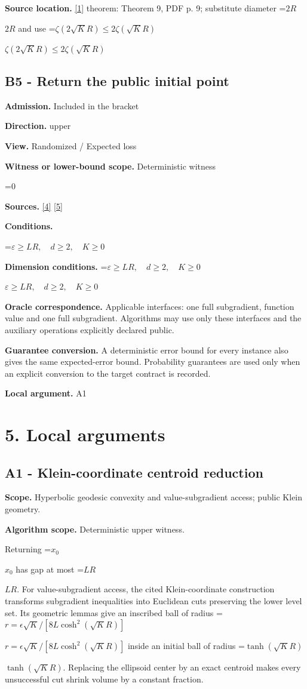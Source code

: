 \documentclass[10pt,a4paper]{article}
\newcommand{\AtlasMath}[1]{\par\begingroup\centering\setbox0=\hbox{$\displaystyle #1$}\ifdim\wd0>1.4\linewidth\typeout{ATLAS WIDE FORMULA: \the\wd0}\fi\ifdim\wd0>\linewidth\resizebox{\linewidth}{!}{\box0}\else\box0\fi\par\endgroup}
\newcommand{\AtlasInlineMath}[1]{\begingroup\setbox0=\hbox{$#1$}\ifdim\wd0>.4\linewidth\endgroup\AtlasMath{#1}\else\endgroup$#1$\fi}
\begin{document}
\textbf{Source location.} \href{https://proceedings.mlr.press/v49/zhang16b.pdf}{[1]} theorem: Theorem 9, PDF p. 9; substitute diameter \AtlasInlineMath{2R} and use \AtlasInlineMath{\zeta(2\sqrt K R)\le2\zeta(\sqrt K R)}

\subsection{B5 - Return the public initial point}
\textbf{Admission.} Included in the bracket

\textbf{Direction.} upper

\textbf{View.} Randomized / Expected loss

\textbf{Witness or lower-bound scope.} Deterministic witness

\AtlasMath{0}
\textbf{Sources.} \href{https://arxiv.org/pdf/2605.17540v4}{[4]} \href{https://arxiv.org/pdf/1405.4980}{[5]}

\textbf{Conditions.} 
\AtlasMath{\varepsilon\ge LR,\quad d\ge2,\quad K\ge0}


\textbf{Dimension conditions.} \AtlasInlineMath{\varepsilon\ge LR,\quad d\ge2,\quad K\ge0}

\textbf{Oracle correspondence.} Applicable interfaces: one full subgradient, function value and one full subgradient. Algorithms may use only these interfaces and the auxiliary operations explicitly declared public.

\textbf{Guarantee conversion.} A deterministic error bound for every instance also gives the same expected-error bound. Probability guarantees are used only when an explicit conversion to the target contract is recorded.

\textbf{Local argument.} A1

\section{5. Local arguments}
\subsection{A1 - Klein-coordinate centroid reduction}
\textbf{Scope.} Hyperbolic geodesic convexity and value-subgradient access; public Klein geometry.

\textbf{Algorithm scope.} Deterministic upper witness.

Returning \AtlasInlineMath{x_0} has gap at most \AtlasInlineMath{LR}. For value-subgradient access, the cited Klein-coordinate construction transforms subgradient inequalities into Euclidean cuts preserving the lower level set. Its geometric lemmas give an inscribed ball of radius
\AtlasInlineMath{r=\epsilon\sqrt K/[8L\cosh^2(\sqrt KR)]}
inside an initial ball of radius \AtlasInlineMath{\tanh(\sqrt KR)}. Replacing the ellipsoid center by an exact centroid makes every unsuccessful cut shrink volume by a constant fraction.
\end{document}
